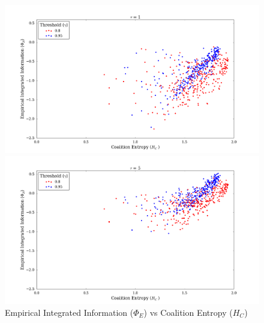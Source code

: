 \documentclass[a4paper,11pt]{article}
\begin{document}
\begin{figure}[H] 
	\begin{minipage}[b]{0.5\linewidth}
		\begin{center}
		\includegraphics[scale = 0.2]{figures/snn/phi_vs_hc_1}
		\end{center}
		\vspace{4ex}
	\end{minipage}
	\begin{minipage}[b]{0.5\linewidth}
		\begin{center}
		\includegraphics[scale = 0.2]{figures/snn/phi_vs_hc_5}
		\end{center}
		\vspace{4ex}
	\end{minipage}
	\caption{
		Empirical Integrated Information ($\Phi_E$) vs Coalition Entropy ($H_C$)
		\label{fig:phi_vs_hc}
	}
\end{figure}
\end{document}
